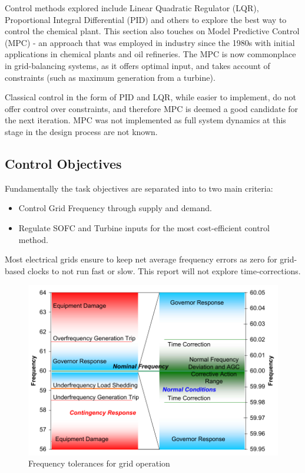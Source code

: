 Control methods explored include Linear Quadratic Regulator (LQR), Proportional Integral Differential (PID) and others to explore the best way to control the chemical plant. This section also touches on Model Predictive Control (MPC) - an approach that was employed in industry since the 1980s with initial applications in chemical plants and oil refineries.
The MPC is now commonplace in grid-balancing systems, as it offers optimal input, and takes account of constraints (such as maximum generation from a turbine). \cite{power:mpcadvs}

Classical control in the form of PID and LQR, while easier to implement, do not offer control over constraints, and therefore MPC is deemed a good candidate for the next iteration.
MPC was not implemented as full system dynamics at this stage in the design process are not known.

\subsection{Control Objectives}

Fundamentally the task objectives are separated into to two main criteria:
\begin{itemize}
\item{Control Grid Frequency through supply and demand.}
\item{Regulate SOFC and Turbine inputs for the most cost-efficient control method.}
\end{itemize}
Most electrical grids ensure to keep net average frequency errors as zero for grid-based clocks to not run fast or slow. This report will not explore time-corrections. \cite{power:timecorrection}

\begin{figure}[htb]
\centering
        \includegraphics[scale=0.7]{images/freq.pdf}
\caption{Frequency tolerances for grid operation \cite{power:freqs}}
\label{fig:freqgrid}
\end{figure}
